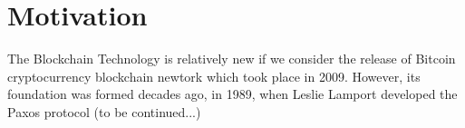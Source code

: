 \chapter*{Motivation} 

The Blockchain Technology is relatively new if we consider the release of Bitcoin cryptocurrency blockchain newtork which took place in 2009. However, its foundation was formed decades ago, in 1989, when Leslie Lamport developed the Paxos protocol (to be continued...) 
